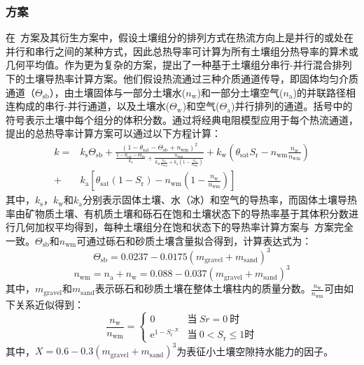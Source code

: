 \subsubsection{\citet{tarnawski2012series}方案}
在~\citet{Johansen1975}方案及其衍生方案中，假设土壤组分的排列方式在热流方向上是并行的或处在并行和串行之间的某种方式，因此总热导率可计算为所有土壤组分热导率的算术或几何平均值。作为更为复杂的方案，\citet{tarnawski2012series}提出了一种基于土壤组分串行-并行混合排列下的土壤导热率计算方案。他们假设热流通过三种介质通道传导，即固体均匀介质通道（$\Theta_{\mathrm{sb}}$），由土壤固体与一部分土壤水($n_{\mathrm {w}} $)和一部分土壤空气($n_{\mathrm {a}} $)的并联路径相连构成的串行-并行通道，以及土壤水($\Theta_{\mathrm {w}} $)和空气($\Theta_{\mathrm {a}} $)并行排列的通道。括号中的符号表示土壤中每个组分的体积分数。通过将经典电阻模型应用于每个热流通道，\citet{tarnawski2012series}提出的总热导率计算方案可以通过以下方程计算：
\begin{equation}
  \begin{aligned}
    k=&k_{\mathrm {s}} \Theta_{\mathrm{sb}}+\frac{(1-\theta_{\mathrm {sat}} -\Theta_{\mathrm{sb}}+n_{\mathrm{wm}})^2}{\frac{1-\theta_{\mathrm {sat}} -\Theta_{\mathrm{sb}}}{k_{\mathrm {s}} }+\frac{n_{\mathrm{wm}}}{k_{\mathrm {w}} \frac{n_{\mathrm {w}} }{n_{\mathrm{wm}}}+k_{\mathrm {a}} \left(1-\frac{n_{\mathrm {w}} }{n_{\mathrm{wm}}}\right)}}+k_{\mathrm {w}} \left(\theta_{\mathrm {sat}}S_{\mathrm {r}} -n_{\mathrm{wm}}\frac{n_{\mathrm {w}} }{n_{\mathrm{wm}}}\right) \\
    +&k_{\mathrm {a}} \left[\theta_{\mathrm {sat}} (1-S_{\mathrm {r}} )-n_{\mathrm{wm}}\left(1-\frac{n_{\mathrm {w}} }{n_{\mathrm{wm}}}\right)\right]
  \end{aligned}
\end{equation}
其中，$k_{\mathrm {s}} $，$k_{\mathrm {w}} $和$k_{\mathrm {a}} $分别表示固体土壤、水（冰）和空气的导热率，而固体土壤导热率由矿物质土壤、有机质土壤和砾石在饱和土壤状态下的导热率基于其体积分数进行几何加权平均得到，每种土壤组分在饱和状态下的导热率计算方案与~\citet{Johansen1975}方案完全一致。$\Theta_{\mathrm{sb}}$和$n_{\mathrm{wm}}$可通过砾石和砂质土壤含量拟合得到，计算表达式为：$$\Theta_{\mathrm{sb}}=0.0237-0.0175\left(m_{\mathrm{gravel}}+m_{\mathrm{sand}}\right)^3$$$$n_{\mathrm{wm}}=n_{\mathrm {a}} +n_{\mathrm {w}} =0.088-0.037\left(m_{\mathrm{gravel}}+m_{\mathrm{sand}}\right)^3$$
其中，$m_{\mathrm{gravel}}$和$m_{\mathrm{sand}}$表示砾石和砂质土壤在整体土壤柱内的质量分数。$\frac{n_{\mathrm {w}} }{n_{\mathrm{wm}}}$可由如下关系近似得到：
\begin{equation}
  \frac{n_{\mathrm {w}} }{n_{\mathrm{wm}}}=\begin{cases}
    0  & \text{当}\ Sr=0\ \text{时} \\
    {\mathrm e}^{1-S_{\mathrm {r}} ^{-X}} & \text{当}\ 0<S_{\mathrm {r}} \leqslant1 \text{时}
  \end{cases}
\end{equation}
其中，$X=0.6-0.3\left(m_{\mathrm{gravel}}+m_{\mathrm{sand}}\right)^3$为表征小土壤空隙持水能力的因子。

